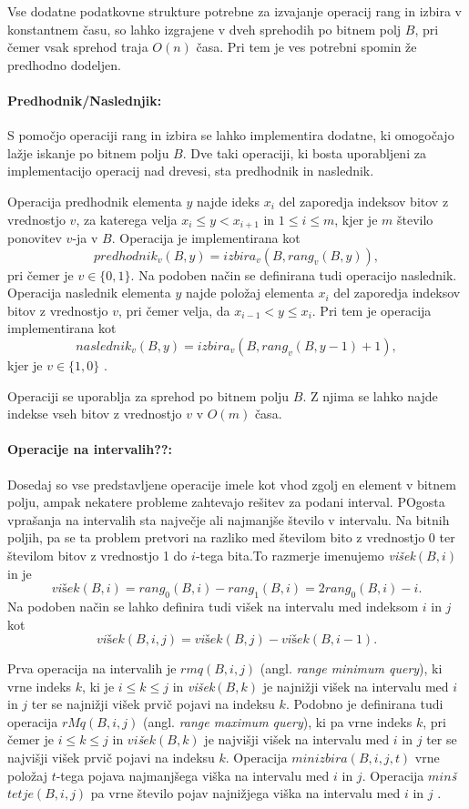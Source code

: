 Vse dodatne podatkovne strukture potrebne za izvajanje operacij rang in izbira v konstantnem času, so lahko izgrajene v dveh sprehodih po bitnem polj $B$, pri čemer vsak sprehod traja $O(n)$ časa. Pri tem je ves potrebni spomin že predhodno dodeljen.

\paragraph{Predhodnik/Naslednjik:}
S pomočjo operaciji rang in izbira se lahko implementira dodatne, ki omogočajo lažje iskanje po bitnem polju $B$. Dve taki operaciji, ki bosta uporabljeni za implementacijo operacij nad drevesi, sta predhodnik in naslednik.

Operacija predhodnik elementa $y$ najde ideks $x_i$ del zaporedja indeksov bitov z vrednostjo $v$, za katerega velja $x_i \le y < x_{i+1}$ in $1\le i\le m$, kjer je $m$ število ponovitev $v$-ja v $B$. Operacija je implementirana kot
    $$predhodnik_v(B,y)=izbira_v(B,rang_v(B,y)),$$
pri čemer je $v\in \{0,1\}$. Na podoben način se definirana tudi operacijo naslednik. Operacija naslednik elementa $y$ najde položaj elementa $x_i$ del zaporedja indeksov bitov z vrednostjo $v$, pri čemer velja, da $x_{i-1}< y \le x_i$. Pri tem je operacija implementirana kot
    $$naslednik_v(B,y)=izbira_v(B,rang_v(B,y-1)+1),$$
kjer je  $v\in \{1,0\}$ \cite{Navarro2016}.

Operaciji se uporablja za sprehod po bitnem polju $B$. Z njima se lahko najde indekse vseh bitov z vrednostjo $v$ v $O(m)$ časa.

\paragraph{Operacije na intervalih??:}
Dosedaj so vse predstavljene operacije imele kot vhod zgolj en element v bitnem polju, ampak nekatere probleme zahtevajo rešitev za podani interval. POgosta vprašanja na intervalih sta največje ali najmanjše število v intervalu. Na bitnih poljih, pa se ta problem pretvori na razliko med številom bito z vrednostjo 0 ter številom bitov z vrednostjo 1 do $i$-tega bita.To razmerje imenujemo \textit{višek}$(B,i)$ in je
$$
    \textit{višek}(B,i)=rang_0(B,i)-rang_1(B,i)=2rang_0(B,i)-i.
$$
Na podoben način se lahko definira tudi višek na intervalu med indeksom $i$ in $j$ kot
$$
    \textit{višek}(B,i,j)=\textit{višek}(B,j)-\textit{višek}(B,i-1).
$$

Prva operacija na intervalih je $rmq(B,i,j)$ (angl. \textit{range minimum query}), ki vrne indeks $k$, ki je $i\le k\le j$ in \textit{višek}$(B,k)$ je najnižji višek na intervalu med $i$ in $j$ ter se najnižji višek prvič pojavi na indeksu $k$. Podobno je definirana tudi operacija $rMq(B,i,j)$ (angl. \textit{range maximum query}), ki pa vrne indeks $k$, pri čemer je $i\le k\le j$ in $vi$\textit{š}$ek(B,k)$ je najvišji višek na intervalu med $i$ in $j$ ter se najvišji višek prvič pojavi na indeksu $k$. Operacija $minizbira(B,i,j,t)$ vrne položaj $t$-tega pojava najmanjšega viška na intervalu med $i$ in $j$. Operacija $min$\textit{š}$tetje(B,i,j)$ pa vrne število pojav najnižjega viška na intervalu med $i$ in $j$ \cite{Navarro2016}.

